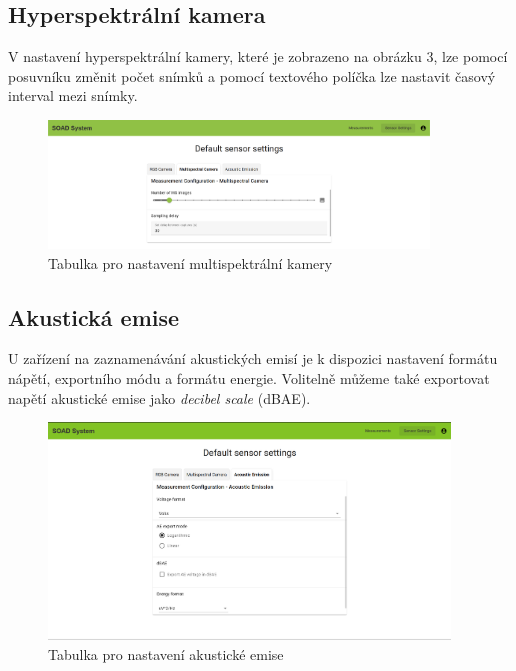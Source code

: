\documentclass[12pt]{article}
\begin{document}
\begin{teamwork}
        \subsection{Hyperspektrální kamera}\label{subsec:hyperspektralni-kamera}

        V nastavení hyperspektrální kamery, které je zobrazeno na obrázku 3,
        lze pomocí posuvníku změnit počet snímků a pomocí textového políčka lze nastavit časový interval mezi snímky.

        \begin{figure}[hbt!]
            \centering
            \includegraphics[width=0.9\textwidth]{../../img/multi_cam_settings}
            \caption{Tabulka pro nastavení multispektrální kamery}
            \label{fig:multi_cam_settings}
        \end{figure}

        \subsection{Akustická emise}\label{subsec:akusticka-emise}

        U zařízení na zaznamenávání akustických emisí je k dispozici nastavení formátu nápětí, exportního módu a formátu energie.
        Volitelně můžeme také exportovat napětí akustické emise jako \textit{decibel scale} (dBAE).

        \begin{figure}[hbt!]
            \centering
            \includegraphics[width=0.95\textwidth]{../../img/ae_settings}
            \caption{Tabulka pro nastavení akustické emise}
            \label{fig:ae_settings}
        \end{figure}


\end{teamwork}
\end{document}

